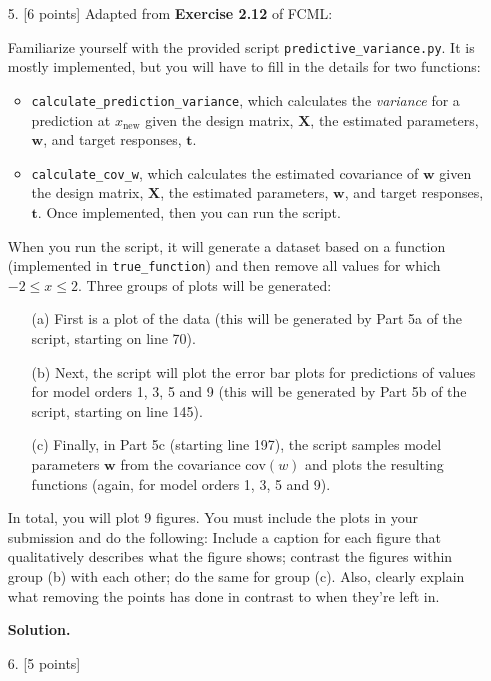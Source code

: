 \documentclass[10pt]{article}
\begin{document}
\begin{itemize}
\item[5.] [6 points]
Adapted from {\bf Exercise 2.12} of FCML:

Familiarize yourself with the provided script {\tt predictive\_variance.py}.  
It is mostly implemented, but you will have to fill in the details for two functions: 
\begin{itemize}
\item {\tt calculate\_prediction\_variance}, which calculates the {\em variance} for a prediction at $x_{\mathrm{new}}$ given the design matrix, $\mathbf{X}$, the estimated parameters, $\mathbf{w}$, and target responses, $\mathbf{t}$.
\item {\tt calculate\_cov\_w}, which calculates the estimated covariance of $\mathbf{w}$ given the design matrix, $\mathbf{X}$, the estimated parameters, $\mathbf{w}$, and target responses, $\mathbf{t}$.
Once implemented, then you can run the script.
\end{itemize}

When you run the script, it will generate a dataset based on a function (implemented in {\tt true\_function}) and then remove all values for which $-2 \leq x \leq 2$.  Three groups of plots will be generated:
\begin{enumerate}
\item[(a)] First is a plot of the data (this will be generated by Part 5a of the script, starting on line 70).  
\item[(b)] Next, the script will plot the error bar plots for predictions of values for model orders 1, 3, 5 and 9 (this will be generated by Part 5b of the script, starting on line 145).  
\item[(c)] Finally, in Part 5c (starting line 197), the script samples model parameters $\mathbf{w}$ from the covariance $\mathrm{cov}(w)$ and plots the resulting functions (again, for model orders 1, 3, 5 and 9).
\end{enumerate}

In total, you will plot 9 figures.  You must include the plots in your submission and do the following: Include a caption for each figure that qualitatively describes what the figure shows; contrast the figures within group (b) with each other; do the same for group (c).  Also, clearly explain what removing the points has done in contrast to when they're left in.

{\bf Solution.}



\item[6.] [5 points]


\end{itemize}
\end{document}
